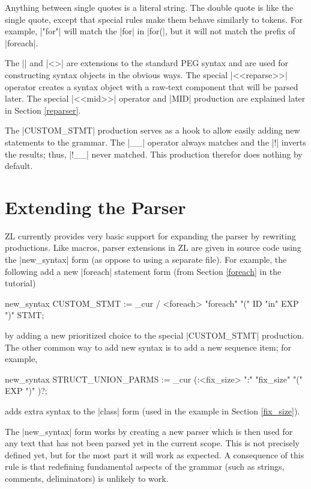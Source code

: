 Anything between single quotes is a literal string.  The double quote
is like the single quote, except that special rules make them behave
similarly to tokens.  For example, |"for"| will match the |for| in
|for(|, but it will not match the prefix of |foreach|.  

The |{}| and |<>| are extensions to the standard PEG syntax and are
used for constructing syntax objects in the obvious ways.  The special
|<<reparse>>| operator creates a syntax object with a raw-text
component that will be parsed later.  The special |<<mid>>| operator
and |MID| production are explained later in Section \ref{reparser}.

The |CUSTOM_STMT| production serves as a hook to allow easily adding
new statements to the grammar.  The |__| operator always matches and
the |!| inverts the results; thus, |!__| never matched.  This
production therefor does nothing by default.

\section{Extending the Parser}
\label{extending-parser}

ZL currently provides very basic support for expanding the parser by
rewriting productions.  Like macros, parser extensions in ZL are given
in source code using the |new_syntax| form (as oppose to using a
separate file).  For example, the following add a new |foreach|
statement form (from Section \ref{foreach} in the tutorial)
\begin{code}
new_syntax {
  CUSTOM_STMT := _cur / <foreach> "foreach" "(" {ID} "in" {EXP} ")" {STMT};
}
\end{code}
by adding a new prioritized choice to the special |CUSTOM_STMT|
production.  The other common way to add new syntax is to add a new
sequence item; for example,
\begin{code}
new_syntax {
  STRUCT_UNION_PARMS := _cur (:<fix_size> ":" "fix_size" "(" {EXP} ")" )?;
}
\end{code}
adds extra syntax to the |class| form (used in the example in Section
\ref{fix_size}).

The |new_syntax| form works by creating a new parser which is then
used for any text that has not been parsed yet in the current scope.
This is not precisely defined yet, but for the most part it will work as
expected.  A consequence of this rule is that redefining fundamental
aspects of the grammar (such as strings, comments, deliminators) is
unlikely to work.


